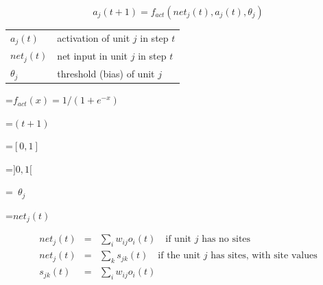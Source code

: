 {\newpage
\clearpage
\samepage \begin{displaymath}%
a_{j}(t+1) = f_{act}(net_{j}(t), a_{j}(t), \theta_{j})
\end{displaymath}
}

{\newpage
\clearpage
\samepage \begin{tabular}%
{ll}
         $a_{j}(t)$   & activation of unit $j$ in step $t$\\ 
         $net_{j}(t)$ & net input in unit $j$ in step $t$\\ 
         $\theta_{j}$ & threshold (bias) of unit $j$\\ 
\end{tabular}
}

{\newpage
\clearpage
\samepage \setbox\sizebox=\hbox{$f_{act}(x) = 1 / (1+e^{-x})$}\box\sizebox
}

{\newpage
\clearpage
\samepage \setbox\sizebox=\hbox{$(t+1)$}\box\sizebox
}

{\newpage
\clearpage
\samepage \setbox\sizebox=\hbox{$[0,1]$}\box\sizebox
}

{\newpage
\clearpage
\samepage \setbox\sizebox=\hbox{$]0,1[$}\box\sizebox
}

{\newpage
\clearpage
\samepage \setbox\sizebox=\hbox{%
$\theta_{j}$}\box\sizebox
}

{\newpage
\clearpage
\samepage \setbox\sizebox=\hbox{$net_{j}(t)$}\box\sizebox
}

{\newpage
\clearpage
\samepage \begin{eqnarray*}net_{j}(t) & = & \sum_{i} w_{ij} o_{i}(t) \quad 
        \mbox{if unit $j$ has no sites } \\ 
        net_{j}(t) & = & \sum_{k} s_{jk}(t)       \quad 
        \mbox{if the unit $j$ has sites, with site values}\\ 
        s_{jk}(t) & = & \sum_{i} w_{ij} o_{i}(t) \nonumber\\ 
\end{eqnarray*}
}

